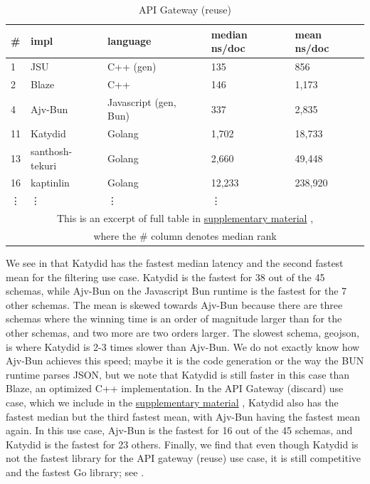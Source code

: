 \documentclass[runningheads]{llncs}
\newcommand{\supplementarymaterial}{%
  \hyperref[supplementary_material]{supplementary material}\xspace%
}
\begin{document}
\begin{table}
\caption{API Gateway (reuse)}
\label{table_api_gateway_reuse}
\begin{tabular}{ll|l|ll}
\midrule
\# & impl & language & median ns/doc & mean ns/doc \\
\midrule
1 & JSU & C++ (gen) & 135 & 856 \\
2 & Blaze & C++ & 146 & 1,173 \\
4 & Ajv-Bun & Javascript (gen, Bun) & 337 & 2,835 \\
11 & Katydid & Golang & 1,702 & 18,733 \\
13 & santhosh-tekuri & Golang & 2,660 & 49,448 \\
16 & kaptinlin & Golang & 12,233 & 238,920 \\
\vdots & \vdots & \vdots & \vdots \\
\multicolumn{5}{c}{This is an excerpt of full table in \supplementarymaterial,}\\
\multicolumn{5}{c}{where the \# column denotes median rank} \\
\end{tabular}
\end{table}

We see in  that Katydid has the fastest median latency and the second fastest mean for the filtering use case.
Katydid is the fastest for 38 out of the 45 schemas, while Ajv-Bun on the Javascript
Bun runtime is the fastest for the 7 other schemas.
The mean is skewed towards Ajv-Bun because there are three schemas where the winning time is an order of magnitude larger than for the other schemas, and two more are two orders larger.
The slowest schema, geojson, is where Katydid is 2-3 times slower than Ajv-Bun.
We do not exactly know how Ajv-Bun achieves this speed; maybe it is the code generation or the way the BUN runtime parses JSON, but we note that Katydid is still faster in this case than Blaze, an optimized C++ implementation.
In the API Gateway (discard) use case, which we include in the \supplementarymaterial, Katydid also has the fastest median but the third fastest mean, with Ajv-Bun having the fastest mean again.
In this use case, Ajv-Bun is the fastest for 16 out of the 45 schemas, and Katydid is the fastest for 23 others.
Finally, we find that even though Katydid is not the fastest library for the API gateway (reuse) use case, it is still competitive and the fastest Go library; see .
\end{document}
